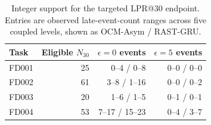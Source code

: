 \begin{table}[H]
\centering
\small
\caption{Integer support for the targeted LPR@30 endpoint. Entries are observed late-event-count ranges across five coupled levels, shown as OCM-Asym / RAST-GRU.}
\label{tab:lpr30-event-support}
\begin{tabular}{lrrr}
\toprule
Task & Eligible $N_{30}$ & $\epsilon=0$ events & $\epsilon=5$ events \\
\midrule
FD001 & 25 & 0--4 / 0--8 & 0--0 / 0--0 \\
FD002 & 61 & 3--8 / 1--16 & 0--0 / 0--2 \\
FD003 & 20 & 1--6 / 1--5 & 0--1 / 0--1 \\
FD004 & 53 & 7--17 / 15--23 & 0--4 / 3--7 \\
\bottomrule
\end{tabular}
\end{table}
